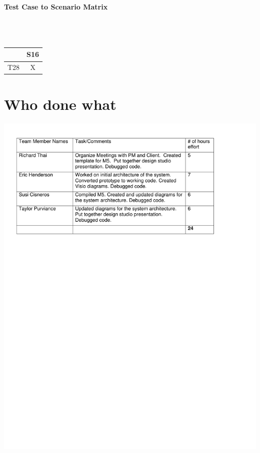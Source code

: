 \documentclass{article}
\begin{document}
\paragraph{Test Case to Scenario Matrix}~\\ \\
\begin{tabular}{ | c || c | }
\hline
    & S16  \\
\hline
\hline
T28 &  X  \\
\hline
\end{tabular}


\section{Who done what}
\includegraphics[keepaspectratio, width=6in]{wdwM5.pdf}\\
\end{document}
